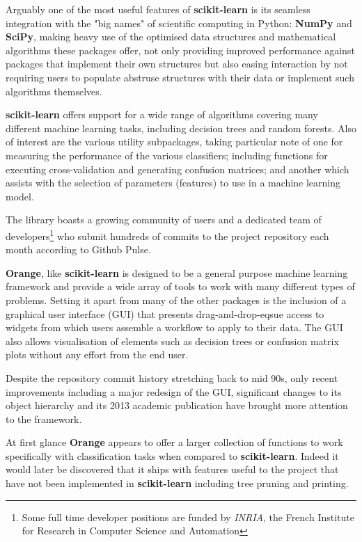 Arguably one of the most useful features of \textbf{scikit-learn} is its
seamless integration with the "big names" of scientific computing in Python:
\textbf{NumPy}\citep{NumPySciPy} and \textbf{SciPy}\citep{SciPy}, making heavy
use of the optimised data structures and mathematical algorithms these packages
offer, not only providing improved performance against packages that implement
their own structures but also easing interaction by not requiring users to
populate abstruse structures with their data or implement such algorithms
themselves.

\textbf{scikit-learn} offers support for a wide range of algorithms covering
many different machine learning tasks, including decision trees and random
forests. Also of interest are the various utility subpackages, taking particular
note of one for measuring the performance of the various classifiers;
including functions for executing cross-validation and generating confusion
matrices; and another which assists with the selection of parameters (features)
to use in a machine learning model.

The library boasts a growing community of users and a dedicated team of
developers\footnote{Some full time developer positions are funded by
\textit{INRIA}, the French Institute for Research in Computer Science and
Automation} who submit hundreds of commits to the project repository each month
according to Github Pulse.


\textbf{Orange}, like \textbf{scikit-learn} is designed to be a general purpose
machine learning framework and provide a wide array of tools to work with many
different types of problems. Setting it apart from many of the other packages is
the inclusion of a graphical user interface (GUI) that presents
drag-and-drop-eqsue access to widgets from which users assemble a workflow to
apply to their data. The GUI also allows visualisation of elements such as
decision trees or confusion matrix plots without any effort from the end user.

Despite the repository commit history stretching back to mid 90s, only recent
improvements including a major redesign of the GUI, significant changes to
its object hierarchy and its 2013 academic publication have brought more
attention to the framework.

At first glance \textbf{Orange} appears to offer a larger collection of
functions to work specifically with classification tasks when compared to
\textbf{scikit-learn}. Indeed it would later be discovered that it ships with
features useful to the project that have not been implemented in
\textbf{scikit-learn} including tree pruning and printing.


